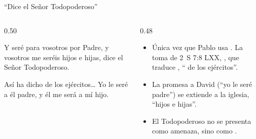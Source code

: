 \begin{frame}{``Dice el Señor Todopoderoso''}
\begin{columns}[c,onlytextwidth]
\begin{column}{0.50\textwidth}
\begin{cita}Y seré para vosotros por Padre, y vosotros me seréis hijos e hijas, dice el Señor Todopoderoso.\end{cita}
\begin{cita}[fontupper=\scriptsize\itshape]Así ha dicho \SENOR{} de los ejércitos\ldots{} Yo le seré a él padre, y él me será a mí hijo.\end{cita}
\end{column}
\begin{column}{0.48\textwidth}\small
\begin{itemize}
\item Única vez que Pablo usa . La toma de 2~S 7:8 LXX, , que traduce , ``\SENOR{} de los ejércitos''.
\item La promesa a David (``yo le seré padre'') se extiende a la iglesia, ``hijos e hijas''.
\item El Todopoderoso no se presenta como amenaza, sino como .
\end{itemize}
\end{column}
\end{columns}
\end{frame}

